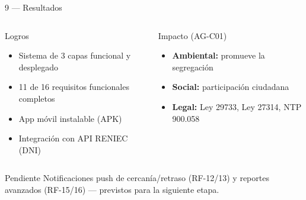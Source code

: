\documentclass[aspectratio=169, 11pt]{beamer}
\begin{document}
\begin{frame}{9 — Resultados}
    \vspace{-0.3cm}
    \begin{columns}[T]
    \begin{block}{Logros}
        \footnotesize
        \begin{itemize}
            \item Sistema de 3 capas funcional y desplegado
            \item 11 de 16 requisitos funcionales completos
            \item App móvil instalable (APK)
            \item Integración con API RENIEC (DNI)
        \end{itemize}
    \end{block}

    \begin{block}{Impacto (AG-C01)}
        \footnotesize
        \begin{itemize}
            \item \textbf{Ambiental:} promueve la segregación
            \item \textbf{Social:} participación ciudadana
            \item \textbf{Legal:} Ley 29733, Ley 27314, NTP 900.058
        \end{itemize}
    \end{block}
    \end{columns}
    \vspace{0.1cm}
    \begin{block}{Pendiente}
        \footnotesize
        Notificaciones push de cercanía/retraso (RF-12/13) y reportes avanzados (RF-15/16) — previstos para la siguiente etapa.
    \end{block}
\end{frame}
\end{document}
